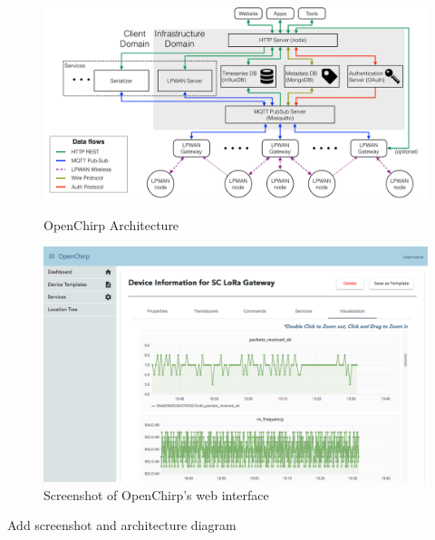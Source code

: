 \documentclass[conference]{IEEEtran}
\begin{document}

\begin{figure}[!htb]
    \centering
    \begin{minipage}[b]{.6\textwidth}
        \centering
        \includegraphics[width=\linewidth]{figures/openChirp_architecture}
        \caption{OpenChirp Architecture}
        \label{fig:oc-arch}
    \end{minipage}%
    \begin{minipage}[b]{.4\textwidth}
        \centering
        \includegraphics[width=\linewidth]{figures/OC_screenshot}
        \caption{Screenshot of OpenChirp's web interface}
        \label{fig:oc-screenshot}
    \end{minipage}
\end{figure}

{\color{red} Add screenshot and architecture diagram}
\end{document}
